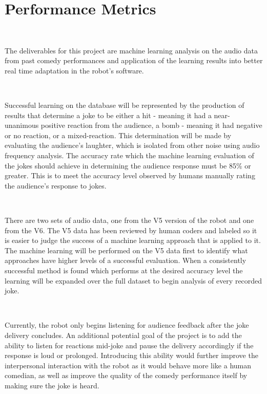 \documentclass[onecolumn, draftclsnofoot,10pt, compsoc]{IEEEtran}
\begin{document}
\section{Performance Metrics}
\ \par
\noindent The deliverables for this project are machine learning analysis on the audio data from past comedy performances and application of the learning results into better real time adaptation in the robot's software.\par
\ \par
\noindent Successful learning on the database will be represented by the production of results that determine a joke to be either a hit - meaning it had a near-unanimous positive reaction from the audience, a bomb - meaning it had negative or no reaction, or a mixed-reaction. This determination will be made by evaluating the audience's laughter, which is isolated from other noise using audio frequency analysis. The accuracy rate which the machine learning evaluation of the jokes should achieve in determining the audience response must be 85\% or greater. This is to meet the accuracy level observed by humans manually rating the audience's response to jokes.\par
\ \par
\noindent There are two sets of audio data, one from the V5 version of the robot and one from the V6. The V5 data has been reviewed by human coders and labeled so it is easier to judge the success of a machine learning approach that is applied to it. The machine learning will be performed on the V5 data first to identify what approaches have higher levels of a successful evaluation. When a consistently successful method is found which performs at the desired accuracy level the learning will be expanded over the full dataset to begin analysis of every recorded joke.\par
\ \par
\noindent Currently, the robot only begins listening for audience feedback after the joke delivery concludes. An additional potential goal of the project is to add the ability to listen for reactions mid-joke and pause the delivery accordingly if the response is loud or prolonged. Introducing this ability would further improve the interpersonal interaction with the robot as it would behave more like a human comedian, as well as improve the quality of the comedy performance itself by making sure the joke is heard.
\end{document}
